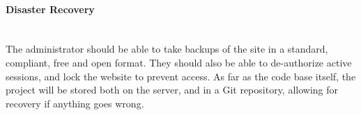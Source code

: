 \paragraph{Disaster Recovery}\ \\
 The administrator should be able to take backups of the site in a standard, compliant, free and open format. They should also be able to de-authorize active sessions, and lock the website to prevent access. As far as the code base itself, the project will be stored both on the server, and in a Git repository, allowing for recovery if anything goes wrong.